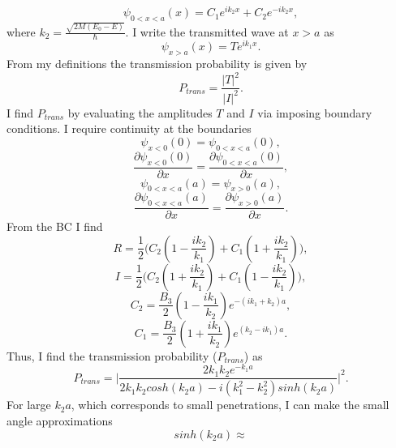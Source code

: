 \begin{example}
\begin{equation}
		\psi_{0<x<a}(x)=C_1e^{ik_2x}+C_2e^{-ik_2x},
	\end{equation} 
	where $k_2=\frac{\sqrt{2M(E_0-E)}}{\hbar}$. I write the transmitted wave at $x>a$ as
	\begin{equation}
		\psi_{x>a}(x)=Te^{ik_1x}.
	\end{equation} 
	From my definitions the transmission probability is given by
	\begin{equation}
		P_{trans}=\frac{|T|^2}{|I|^2}.
	\end{equation} 
	I find $P_{trans}$ by evaluating the amplitudes $T$ and $I$ via imposing boundary conditions. I require continuity at the boundaries
	\begin{equation}
		\psi_{x<0}(0)=\psi_{0<x<a}(0),
	\end{equation} 
	\begin{equation}
		\frac{\partial \psi_{x<0}(0)}{\partial x}=\frac{\partial \psi_{0<x<a}(0)}{\partial x},
	\end{equation} 
	\begin{equation}
		\psi_{0<x<a}(a)=\psi_{x>0}(a),
	\end{equation} 
	\begin{equation}
		\frac{\partial \psi_{0<x<a}(a)}{\partial x}=\frac{\partial \psi_{x>0}(a)}{\partial x}.
	\end{equation} 
	From the BC I find
	\begin{equation}
		R=\frac{1}{2}\bigg(C_2(1-\frac{ik_2}{k_1})+C_1(1+\frac{ik_2}{k_1})\bigg),
	\end{equation} 
	\begin{equation}
		I=\frac{1}{2}\bigg(C_2(1+\frac{ik_2}{k_1})+C_1(1-\frac{ik_2}{k_1})\bigg),
	\end{equation} 
	\begin{equation}
		C_2=\frac{B_3}{2}(1-\frac{ik_1}{k_2})e^{-(ik_1+k_2)a},
	\end{equation} 
	\begin{equation}
		C_1=\frac{B_3}{2}(1+\frac{ik_1}{k_2})e^{(k_2-ik_1)a}.
	\end{equation} 
	Thus, I find the transmission probability ($P_{trans}$) as~\citep[p.340]{BR}
	\begin{equation}
		P_{trans}=\bigg|\frac{2k_1k_2e^{-k_1a}}{2k_1k_2cosh(k_2a)-i(k_1^2-k_2^2)sinh(k_2a)}\bigg|^2.
		\label{ptrans}
	\end{equation} 
	For large $k_2a$, which corresponds to small penetrations, I can make the small angle approximations
	\begin{equation}
		sinh(k_2a)\approx

\end{equation}
\end{example}
